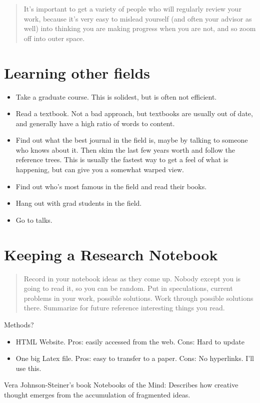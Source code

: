 \blockquote{It’s important to get a variety of people who will regularly review
your work, because it's very easy to mislead yourself (and often your advisor as
well) into thinking you are making progress when you are not, and so zoom off
into outer space.}

\section{Learning other fields}
\begin{itemize}
\item Take a graduate course. This is solidest, but is often not efficient.
\item Read a textbook. Not a bad approach, but textbooks are usually out of date, and generally have a high ratio of words to content.
\item Find out what the best journal in the field is, maybe by talking to someone who knows about it. Then skim the last few years worth and follow the reference trees. This is usually the fastest way to get a feel of what is happening, but can give you a somewhat warped view.
\item Find out who’s most famous in the field and read their books.
\item Hang out with grad students in the field.
\item Go to talks. 
\end{itemize}

\section{Keeping a Research Notebook}
\blockquote{Record in your notebook ideas as they come up. Nobody except you is going
to read it, so you can be random. Put in speculations, current problems in your
work, possible solutions. Work through possible solutions there. Summarize for
future reference interesting things you read.}

Methods?
\begin{itemize}
\item HTML Website. Pros: easily accessed from the web. Cons: Hard to update
\item One big Latex file. Pros: easy to transfer to a paper. Cons: No
hyperlinks. I'll use this.
\end{itemize}

Vera Johnson-Steiner's book Notebooks of the Mind: Describes how creative
thought emerges from the accumulation of fragmented ideas.

